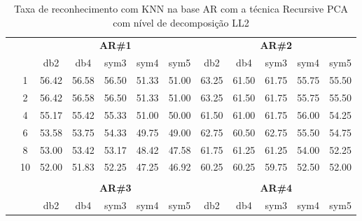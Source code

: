 \begin{table}[H]
	\centering
    \normalsize
	\caption{Taxa de reconhecimento com KNN na base AR com a técnica Recursive PCA com nível de decomposição LL2}
	\begin{tabular}{|c|c|c c c c c|c c c c c|}
\cline{3-12}
\multicolumn{2}{c|}{\multirow{2}{*}{}} & \multicolumn{5}{c|}{\textbf{AR\#1}}  & \multicolumn{5}{c|}{\textbf{AR\#2}} \\\cline{3-12}

\multicolumn{2}{c|}{}  & db2 & db4 & sym3 & sym4 & sym5 & db2 & db4& sym3 & sym4 & sym5 \\\hline

\multicolumn{1}{|c|}{ \multirow{5}{*}{\rotatebox[origin=c]{90}{\textbf{K-vizinhos}}} }
&1	&56.42&	56.58&	56.50&	51.33&	51.00&	63.25&	61.50&	61.75&	55.75&	55.50 \\\cline{2-12}
&2	&56.42&	56.58&	56.50&	51.33&	51.00&	63.25&	61.50&	61.75&	55.75&	55.50 \\\cline{2-12}
&4	&55.17&	55.42&	55.33&	51.00&	50.00&	61.50&	61.00&	61.75&	56.00&	54.25 \\\cline{2-12}
&6	&53.58&	53.75&	54.33&	49.75&	49.00&	62.75&	60.50&	62.75&	55.50&	54.75 \\\cline{2-12}
&8	&53.00&	53.42&	53.17&	48.42&	47.58&	61.75&	61.25&	61.25&	54.00&	52.25 \\\cline{2-12}
&10	&52.00&	51.83&	52.25&	47.25&	46.92&	60.25&	60.25&	59.75&	52.50&	52.00 

\\ \midrule
\multicolumn{12}{c}{}\\ 




\cline{3-12}
\multicolumn{2}{c}{} & \multicolumn{5}{|c|}{\textbf{AR\#3}}  & \multicolumn{5}{c|}{\textbf{AR\#4}} \\\cline{3-12}
\multicolumn{2}{c}{}  & \multicolumn{1}{|c}{db2} & db4 & sym3 & sym4 & sym5 & db2 & db4& sym3 & sym4 & sym5 \\\hline


\end{tabular}
\end{table}

